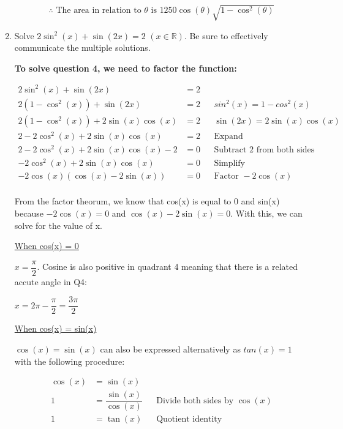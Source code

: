 \documentclass[12pt]{book}
\begin{document}
\begin{enumerate}
\vspace{-0.5cm}
$$\boxed{\therefore \text{ The area in relation to } \theta \text{ is } 1250\cos(\theta)\sqrt{1 - \cos^2(\theta)}}$$

\newpage


\item Solve $2\sin^2(x) + \sin(2x) = 2$ $(x \in \mathbb{R})$. Be sure to effectively communicate the multiple solutions.

\textbf{To solve question 4, we need to factor the function:}

\begin{align*}
    2\sin^2(x) + \sin(2x) &= 2 \\
    2(1-\cos^2(x)) + \sin(2x) &= 2 && sin^2(x) = 1 - cos^2(x) \\
    2(1-\cos^2(x)) + 2\sin(x)\cos(x) &= 2 && \sin(2x) = 2\sin(x)\cos(x) \\
    2-2\cos^2(x) + 2\sin(x)\cos(x) &= 2 && \text{Expand}\\
    2 - 2\cos^2(x) + 2\sin(x)\cos(x) - 2 &= 0 && \text{Subtract 2 from both sides}\\
    - 2\cos^2(x) + 2\sin(x)\cos(x) &= 0 && \text{Simplify}\\
    - 2\cos(x)(\cos(x) - 2\sin(x)) &= 0 && \text{Factor } -2\cos(x)\\
\end{align*}

From the factor theorum, we know that cos(x) is equal to 0 and sin(x) because $- 2\cos(x) = 0$ and $\cos(x) - 2\sin(x) = 0$. With this, we can solve for the value of x.

\vspace{0.3cm}
\underline{When cos(x) = 0}

\vspace{0.1cm}
$x = \boxed{\dfrac{\pi}{2}}$. Cosine is also positive in quadrant 4 meaning that there is a 
related accute angle in Q4:

$x = 2\pi - \dfrac{\pi}{2} = \boxed{\dfrac{3\pi}{2}}$

\vspace{0.3cm}
\underline{When cos(x) = sin(x)}

$\cos(x) = \sin(x)$ can also be expressed alternatively as $tan(x) = 1$ with the following procedure:

\begin{align*}
    \cos(x) &= \sin(x) \\
    1 &= \dfrac{\sin(x)}{\cos(x)} && \text{Divide both sides by } \cos(x) \\
    1 &= \tan(x) && \text{Quotient identity}
\end{align*}


\end{enumerate}
\end{document}
